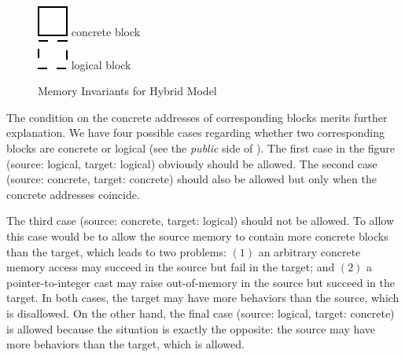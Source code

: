 \begin{figure}[t]
\center
  \begin{minipage}[b]{0.28\textwidth}
  \end{minipage}
  \begin{minipage}[b]{0.14\textwidth}
  \includegraphics[scale=0.25]{intptrcast-figure/physical-block.png} concrete block\\[2mm]
  \includegraphics[scale=0.25]{intptrcast-figure/logical-block.png} logical block\\
  \mbox{}
  \end{minipage}
\caption{Memory Invariants for Hybrid Model}\label{fig:invariant}
\end{figure}

The condition on the concrete addresses of corresponding blocks
merits further explanation. We have four possible cases
regarding whether two corresponding blocks are concrete or logical (see the
\emph{public} side of ).  The first case in
the figure (\ie source: logical, target: logical) obviously should be
allowed. The second case (\ie source: concrete, target: concrete)
should also be allowed but only when the concrete addresses
coincide. 

The third case (\ie source: concrete, target: logical) should not be
allowed. To allow this case would be to allow the source memory to contain more concrete
blocks than the target, which leads to two problems: $(1)$ an arbitrary
concrete memory access may succeed in the source but fail in the
target; and $(2)$ a pointer-to-integer cast may raise out-of-memory
in the source but succeed in the target.  In both cases, the target
may have more behaviors than the source, which is disallowed.  On the
other hand, the final case (\ie source: logical, target: concrete) is
allowed because the situation is exactly the opposite: the source may
have more behaviors than the target, which is allowed.

